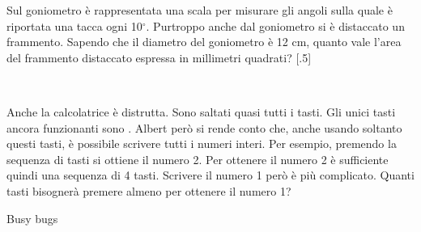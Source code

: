 \documentclass[12pt]{matemaj}
\begin{document}
\vspace{-.8cm}
\quesitotc[300;400]
[.5]Sul goniometro è rappresentata una scala per misurare gli angoli sulla quale è riportata una tacca ogni 10$^\circ$. Purtroppo anche dal goniometro si è distaccato un frammento. Sapendo che il diametro del goniometro è 12 cm, quanto vale l'area del frammento distaccato espressa in millimetri quadrati?
[.5]\tikspace{} \\ \vspace{.3cm}\tikspace{}

\vspace{-.8cm}
\quesito[1;50]
Anche la calcolatrice è distrutta. Sono saltati quasi tutti i tasti. Gli unici tasti ancora funzionanti sono\;   \btn{+} \btn{-} \btn{=}. Albert però si rende conto che, anche usando soltanto questi tasti, è possibile scrivere tutti i numeri interi. Per esempio, premendo la sequenza di tasti  \btn{-}  \btn{=} si ottiene il numero 2. Per ottenere il numero 2 è sufficiente quindi una sequenza di 4 tasti. Scrivere il numero 1 però è più complicato. Quanti tasti bisognerà premere almeno per ottenere il numero 1?

\newpage
\titolo Busy bugs
\end{document}
